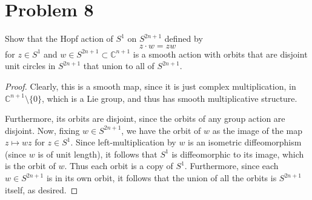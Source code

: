 \documentclass[fontsize=11pt]{scrartcl} %
\numberwithin{equation}{section} %
\numberwithin{figure}{section} %
\numberwithin{table}{section} %
\newcommand{\C}{\mathbb{C}}
\begin{document}
\newpage

\section*{Problem 8}
Show that the Hopf action of $S^1$ on $S^{2n+1}$ defined by
\[
    z\cdot w = zw
\]
for $z\in S^1$ and $w\in S^{2n+1}\subset \C^{n+1}$ is a smooth action with
orbits that are disjoint unit circles in $S^{2n+1}$ that union to all of
$S^{2n+1}$.

\begin{proof}
Clearly, this is a smooth map, since it is just complex multiplication, in
$\C^{n+1}\setminus\{0\}$, which is a Lie group, and thus has smooth
multiplicative structure.

Furthermore, its orbits are disjoint, since the orbits of any group action are
disjoint.
Now, fixing $w\in S^{2n+1}$, we have the orbit of $w$  as the image of the map
$z\mapsto wz$ for $z\in S^1$. Since left-multiplication by $w$ is an isometric
    diffeomorphism (since $w$ is of unit length), it follows that $S^1$ is diffeomorphic to its image, which is
the orbit of $w$. Thus each orbit is a copy of $S^1$. Furthermore, since each
$w\in S^{2n+1}$ is in its own orbit, it follows that the union of all the orbits
is $S^{2n+1}$ itself, as desired.
\end{proof}
\end{document}
